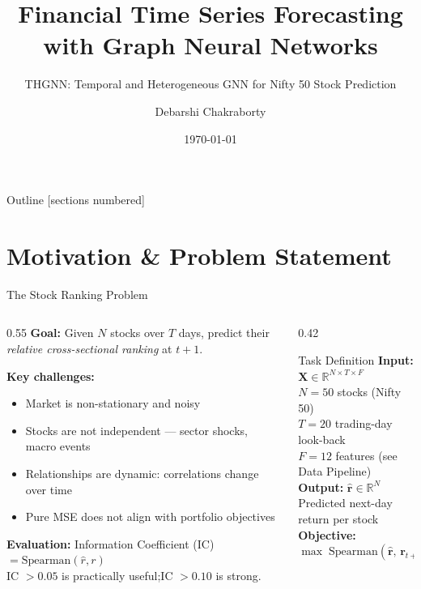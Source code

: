 \documentclass[aspectratio=169, 10pt]{beamer}
\title{Financial Time Series Forecasting\\with Graph Neural Networks}
\subtitle{THGNN: Temporal and Heterogeneous GNN for Nifty 50 Stock Prediction}
\author{Debarshi Chakraborty}
\date{\today}
\institute{Financial Time Series Forecasting Project}
\newcommand{\myvec}[1]{\mathbf{#1}}
\begin{document}
\maketitle

\begin{frame}{Outline}
  [sections numbered]
  \tableofcontents[hideallsubsections]
\end{frame}

\section{Motivation \& Problem Statement}

\begin{frame}{The Stock Ranking Problem}
  \begin{columns}[T]
    \begin{column}{0.55\textwidth}
      \textbf{Goal:} Given $N$ stocks over $T$ days, predict their
      \emph{relative cross-sectional ranking} at $t{+}1$.

      \medskip
      \textbf{Key challenges:}
      \begin{itemize}\setlength{\itemsep}{2pt}
        \item Market is non-stationary and noisy
        \item Stocks are \alert{not independent} — sector shocks, macro events
        \item Relationships are \alert{dynamic}: correlations change over time
        \item Pure MSE does not align with portfolio objectives
      \end{itemize}

      \medskip
      \textbf{Evaluation:} Information Coefficient (IC)
      $= \text{Spearman}(\hat{r}, r)$\\
      \quad IC $>0.05$ is practically useful;\quad IC $>0.10$ is strong.
    \end{column}
    \begin{column}{0.42\textwidth}
      \begin{block}{Task Definition}
        \textbf{Input:} $\myvec{X} \in \mathbb{R}^{N \times T \times F}$\\
        \quad $N=50$ stocks (Nifty 50)\\
        \quad $T=20$ trading-day look-back\\
        \quad $F=12$ features (see Data Pipeline)
        \smallskip\\
        \textbf{Output:} $\hat{\myvec{r}} \in \mathbb{R}^{N}$\\
        \quad Predicted next-day return per stock
        \smallskip\\
        \textbf{Objective:}
        $\max\;\text{Spearman}(\hat{\myvec{r}},\, \myvec{r}_{t+1})$
      \end{block}
    \end{column}
  \end{columns}
\end{frame}
\end{document}
